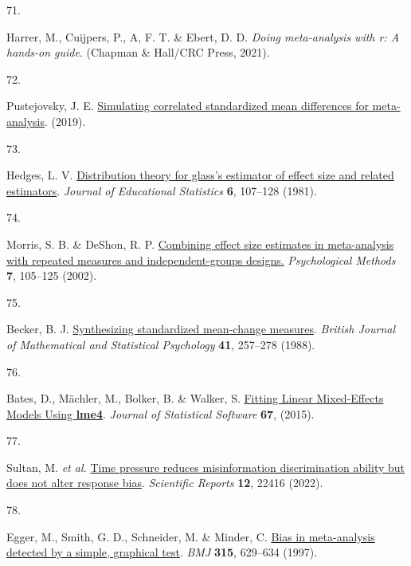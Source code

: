 \documentclass[
  man]{apa6}
\newlength{\cslhangindent}
\newlength{\csllabelwidth}
\newenvironment{CSLReferences}[2] %
 {\begin{list}{}{%
  \setlength{\itemindent}{0pt}
  \setlength{\leftmargin}{0pt}
  \setlength{\parsep}{0pt}
  \ifodd #1
   \setlength{\leftmargin}{\cslhangindent}
   \setlength{\itemindent}{-1\cslhangindent}
  \fi
  \setlength{\itemsep}{#2\baselineskip}}}
 {\end{list}}
\newcommand{\CSLLeftMargin}[1]{\parbox[t]{\csllabelwidth}{\strut#1\strut}}
\newcommand{\CSLRightInline}[1]{\parbox[t]{\linewidth - \csllabelwidth}{\strut#1\strut}}
\begin{document}
\begin{CSLReferences}{0}{0}
\CSLLeftMargin{71. }%
\CSLRightInline{Harrer, M., Cuijpers, P., A, F. T. \& Ebert, D. D. \emph{Doing meta-analysis with r: A hands-on guide}. (Chapman \& Hall/CRC Press, 2021).}

\CSLLeftMargin{72. }%
\CSLRightInline{Pustejovsky, J. E. \href{https://www.jepusto.com/simulating-correlated-smds/}{Simulating correlated standardized mean differences for meta-analysis}. (2019).}

\CSLLeftMargin{73. }%
\CSLRightInline{Hedges, L. V. \href{https://doi.org/10.3102/10769986006002107}{Distribution theory for glass's estimator of effect size and related estimators}. \emph{Journal of Educational Statistics} \textbf{6}, 107--128 (1981).}

\CSLLeftMargin{74. }%
\CSLRightInline{Morris, S. B. \& DeShon, R. P. \href{https://doi.org/10.1037/1082-989X.7.1.105}{Combining effect size estimates in meta-analysis with repeated measures and independent-groups designs.} \emph{Psychological Methods} \textbf{7}, 105--125 (2002).}

\CSLLeftMargin{75. }%
\CSLRightInline{Becker, B. J. \href{https://doi.org/10.1111/j.2044-8317.1988.tb00901.x}{Synthesizing standardized mean-change measures}. \emph{British Journal of Mathematical and Statistical Psychology} \textbf{41}, 257--278 (1988).}

\CSLLeftMargin{76. }%
\CSLRightInline{Bates, D., Mächler, M., Bolker, B. \& Walker, S. \href{https://doi.org/10.18637/jss.v067.i01}{Fitting Linear Mixed-Effects Models Using {\textbf{lme4}}}. \emph{Journal of Statistical Software} \textbf{67}, (2015).}

\CSLLeftMargin{77. }%
\CSLRightInline{*Sultan, M. \emph{et al.} \href{https://doi.org/10.1038/s41598-022-26209-8}{Time pressure reduces misinformation discrimination ability but does not alter response bias}. \emph{Scientific Reports} \textbf{12}, 22416 (2022).}

\CSLLeftMargin{78. }%
\CSLRightInline{Egger, M., Smith, G. D., Schneider, M. \& Minder, C. \href{https://doi.org/10.1136/bmj.315.7109.629}{Bias in meta-analysis detected by a simple, graphical test}. \emph{BMJ} \textbf{315}, 629--634 (1997).}


\end{CSLReferences}
\end{document}
